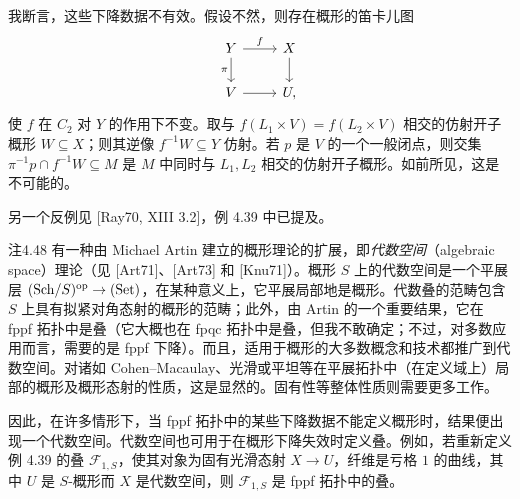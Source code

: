 我断言，这些下降数据不有效。假设不然，则存在概形的笛卡儿图
\[
\begin{tikzcd}
 Y\arrow[r,"{f}"]\arrow[d,"{\pi}"']&X\arrow[d]\\
 V\arrow[r]&U,
\end{tikzcd}
\]
使 $f$ 在 $C_2$ 对 $Y$ 的作用下不变。取与 $f(L_1\times V)=f(L_2\times V)$ 相交的仿射开子概形 $W\subseteq X$；则其逆像 $f^{-1}W\subseteq Y$ 仿射。若 $p$ 是 $V$ 的一个一般闭点，则交集 $\pi^{-1}p\cap f^{-1}W\subseteq M$ 是 $M$ 中同时与 $L_1,L_2$ 相交的仿射开子概形。如前所见，这是不可能的。

另一个反例见 [Ray70, XIII 3.2]，例 4.39 中已提及。

\begin{origstatement}{注}{4.48}\label{ch04:rem448}
有一种由 Michael Artin 建立的概形理论的扩展，即\emph{代数空间}（algebraic space）理论（见 [Art71]、[Art73] 和 [Knu71]）。概形 $S$ 上的代数空间是一个平展层 $(\mathrm{Sch}/S)^{\mathrm{op}}\to(\mathrm{Set})$，在某种意义上，它平展局部地是概形。代数叠的范畴包含 $S$ 上具有拟紧对角态射的概形的范畴；此外，由 Artin 的一个重要结果，它在 fppf 拓扑中是叠（它大概也在 fpqc 拓扑中是叠，但我不敢确定；不过，对多数应用而言，需要的是 fppf 下降）。而且，适用于概形的大多数概念和技术都推广到代数空间。对诸如 Cohen--Macaulay、光滑或平坦等在平展拓扑中（在定义域上）局部的概形及概形态射的性质，这是显然的。固有性等整体性质则需要更多工作。

因此，在许多情形下，当 fppf 拓扑中的某些下降数据不能定义概形时，结果便出现一个代数空间。代数空间也可用于在概形下降失效时定义叠。例如，若重新定义例 4.39 的叠 $\mathcal F_{1,S}$，使其对象为固有光滑态射 $X\to U$，纤维是亏格 $1$ 的曲线，其中 $U$ 是 $S$-概形而 $X$ 是代数空间，则 $\mathcal F_{1,S}$ 是 fppf 拓扑中的叠。
\end{origstatement}
